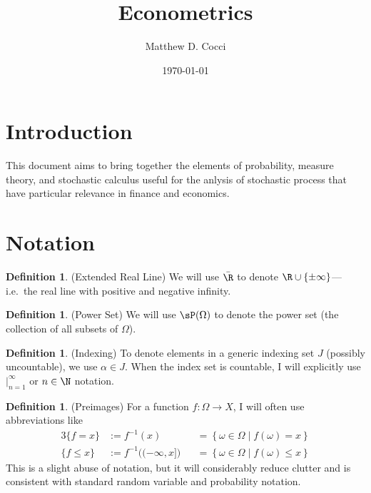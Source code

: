 \documentclass[12pt]{article}
\author{Matthew D. Cocci}
\title{Econometrics}
\date{\today}
\theoremstyle{plain}
\theoremstyle{definition}
\newtheorem{defn}[thm]{Definition}
\theoremstyle{remark}
\newcommand{\ra}{\rightarrow}
\begin{document}
\maketitle
\tableofcontents %

\clearpage

\section{Introduction}

This document aims to bring together the elements of probability,
measure theory, and stochastic calculus useful for the anlysis of
stochastic process that have particular relevance in finance and
economics.


\section{Notation}


\begin{defn}(Extended Real Line)
We will use $\bar{\R}$ to denote $\R \cup \{\pm \infty\}$---i.e.\ the
real line with positive and negative infinity.
\end{defn}

\begin{defn}(Power Set)
We will use $\sP(\Omega)$ to denote the power set (the collection of all
subsets of $\Omega$).
\end{defn}

\begin{defn}(Indexing)
To denote elements in a generic indexing set $J$ (possibly uncountable),
we use $\alpha \in J$. When the index set is countable, I will
explicitly use $|_{n=1}^\infty$ or $n\in\N$ notation.
\end{defn}

\begin{defn}(Preimages)
For a function $f:\Omega\ra X$, I will often use abbreviations like
\begin{alignat*}{3}
  \{f=x\} &:= f^{-1}(x)
  &&= \left\{ \omega\in\Omega \;|\; f(\omega)= x\right\} \\
  \{f \leq x\} &:= f^{-1}\big((-\infty,x]\big)
  &&= \left\{ \omega\in\Omega \;|\; f(\omega)\leq x \right\}
\end{alignat*}
This is a slight abuse of notation, but it will considerably reduce
clutter and is consistent with standard random variable and probability
notation.
\end{defn}
\end{document}
